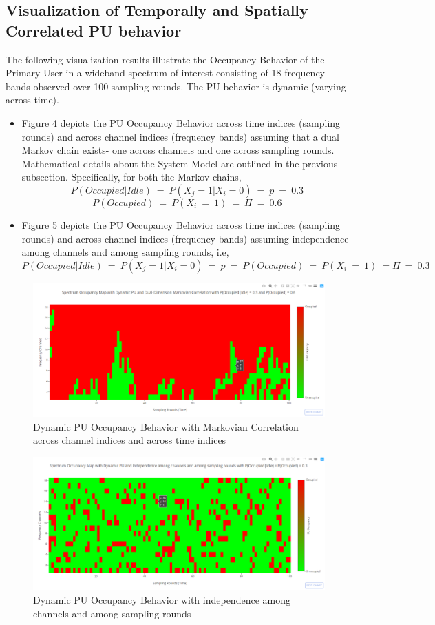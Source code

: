 \documentclass[12pt, draftcls, onecolumn]{IEEEtran}
\begin{document}
\subsection{Visualization of Temporally and Spatially Correlated PU behavior}
The following visualization results illustrate the Occupancy Behavior of the Primary User in a wideband spectrum of interest consisting of 18 frequency bands observed over 100 sampling rounds. The PU behavior is dynamic (varying across time).
\begin{itemize}
    \item Figure 4 depicts the PU Occupancy Behavior across time indices (sampling rounds) and across channel indices (frequency bands) assuming that a dual Markov chain exists- one across channels and one across sampling rounds. Mathematical details about the System Model are outlined in the previous subsection. Specifically, for both the Markov chains, 
    \[P(Occupied|Idle)\ =\ P(X_j = 1|X_i = 0)\ =\ p\ =\ 0.3\]
    \[P(Occupied)\ =\ P(X_i\ =\ 1)\ =\ \Pi\ =\ 0.6\]
    \item Figure 5 depicts the PU Occupancy Behavior across time indices (sampling rounds) and across channel indices (frequency bands) assuming independence among channels and among sampling rounds, i.e,
    \[P(Occupied|Idle)\ =\ P(X_j = 1|X_i = 0)\ =\ p\ =\ P(Occupied)\ =\ P(X_i\ =\ 1)\ = \Pi\ =\ 0.3\]
\end{itemize}
\begin{figure}[t]
\includegraphics[width=1.0\textwidth]{Spectrum_Occupancy_HeatMap_Dynamic_SpatioTemporal_Corr.png}
\caption{Dynamic PU Occupancy Behavior with Markovian Correlation across channel indices and across time indices}
\label{fig:mesh4}
\centering
\end{figure}
\begin{figure}[t]
\includegraphics[width=1.0\textwidth]{Spectrum_Occupancy_HeatMap_Dynamic_Independence.png}
\caption{Dynamic PU Occupancy Behavior with independence among channels and among sampling rounds}
\label{fig:mesh5}
\centering
\end{figure}
\end{document}
